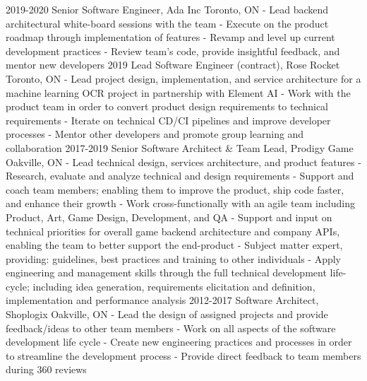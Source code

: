\documentclass[]{cv}
\begin{document}
\begin{entrylist}
    \entry
        {2019-2020}
        {Senior Software Engineer, Ada Inc}
        {Toronto, ON}
        {
        - Lead backend architectural white-board sessions with the team \newline
        - Execute on the product roadmap through implementation of features \newline
        - Revamp and level up current development practices \newline
        - Review team’s code, provide insightful feedback, and mentor new developers \newline
        }
    \entry
        {2019}
        {Lead Software Engineer (contract), Rose Rocket}
        {Toronto, ON}
        {
        - Lead project design, implementation, and service architecture for a machine
        learning OCR project in partnership with Element AI \newline
        - Work with the product team in order to convert product design
        requirements to technical requirements \newline
        - Iterate on technical CD/CI pipelines and improve developer processes \newline
        - Mentor other developers and promote group learning and collaboration \newline }
    \entry
        {2017-2019}
        {Senior Software Architect \& Team Lead, Prodigy Game}
        {Oakville, ON}
        {
        - Lead technical design, services architecture, and product features \newline
        - Research, evaluate and analyze technical and design requirements \newline
        - Support and coach team members; enabling them to improve the product, ship code faster, and enhance their growth \newline
        - Work cross-functionally with an agile team including Product, Art, Game Design, Development, and QA \newline
        - Support and input on technical priorities for overall game backend architecture and company APIs, enabling the team to better support the end-product \newline
        - Subject matter expert, providing: guidelines, best practices and training to other individuals \newline
        - Apply engineering and management skills through the full technical development life-cycle; including idea generation, requirements elicitation and definition,
        implementation and performance analysis \newline
        }
    \entry
        {2012-2017}
        {Software Architect, Shoplogix}
        {Oakville, ON}
        {
        - Lead the design of assigned projects and provide feedback/ideas to other team members \newline
        - Work on all aspects of the software development life cycle \newline
        - Create new engineering practices and processes in order to streamline the development process
        - Provide direct feedback to team members during 360 reviews}
\end{entrylist}
\end{document}
